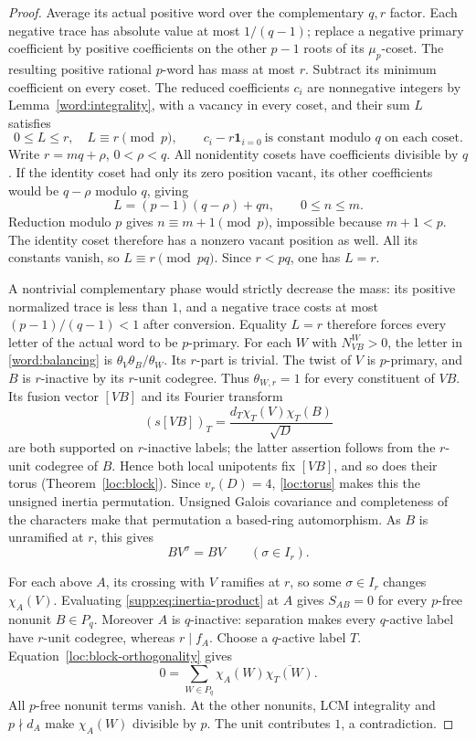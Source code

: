 \documentclass[11pt,a4paper]{article}
\numberwithin{equation}{section}
\begin{document}
\begin{proof}
Average its actual positive word over the complementary
$q,r$ factor. Each negative trace has absolute value at
most $1/(q-1)$; replace a negative primary coefficient
by positive coefficients on the other $p-1$ roots of
its $\mu_p$-coset. The resulting positive rational
$p$-word has mass at most $r$. Subtract its minimum
coefficient on every coset. The reduced coefficients
$c_i$ are nonnegative integers by Lemma~\ref{word:integrality},
with a vacancy in every coset, and their sum $L$ satisfies
\[
 0\le L\le r,\quad L\equiv r\pmod p,\qquad
 c_i-r\mathbf1_{i=0}\ \text{is constant modulo $q$ on each coset}.
\]
Write $r=mq+\rho$, $0<\rho<q$. All nonidentity cosets
have coefficients divisible by $q$. If the identity
coset had only its zero position vacant, its other
coefficients would be $q-\rho$ modulo $q$, giving
\[
 L=(p-1)(q-\rho)+qn,\qquad 0\le n\le m.
\]
Reduction modulo $p$ gives $n\equiv m+1\pmod p$,
impossible because $m+1<p$. The identity coset therefore
has a nonzero vacant position as well. All its constants
vanish, so $L\equiv r\pmod{pq}$. Since $r<pq$, one has
$L=r$.

A nontrivial complementary phase would strictly decrease the mass:
its positive normalized trace is less than $1$, and a negative trace
costs at most $(p-1)/(q-1)<1$ after conversion. Equality $L=r$
therefore forces every letter of the actual word to be $p$-primary.
For each $W$ with $N_{VB}^W>0$, the letter in
\eqref{word:balancing} is $\theta_V\theta_B/\theta_W$.
Its $r$-part is trivial. The twist of $V$ is $p$-primary,
and $B$ is $r$-inactive by its $r$-unit codegree. Thus
$\theta_{W,r}=1$ for every constituent of $VB$. Its fusion
vector $[VB]$ and its Fourier transform
\[
              (s[VB])_T
              =\frac{d_T\chi_T(V)\chi_T(B)}{\sqrt D}
\]
are both supported on $r$-inactive labels; the latter
assertion follows from the $r$-unit codegree of $B$.
Hence both local unipotents fix $[VB]$, and so does
their torus (Theorem~\ref{loc:block}). Since $v_r(D)=4$,
\eqref{loc:torus} makes this the unsigned inertia permutation.
Unsigned Galois covariance and completeness of the characters
make that permutation a based-ring automorphism. As $B$ is
unramified at $r$, this gives
\begin{equation}\label{supp:eq:inertia-product}
                    BV^\sigma=BV\qquad(\sigma\in I_r).
\end{equation}

For each above $A$, its crossing with $V$ ramifies at
$r$, so some $\sigma\in I_r$ changes $\chi_A(V)$.
Evaluating \eqref{supp:eq:inertia-product} at $A$ gives
$S_{AB}=0$ for every $p$-free nonunit $B\in P_q$.
Moreover $A$ is $q$-inactive: separation makes every
$q$-active label have $r$-unit codegree, whereas $r\mid f_A$.
Choose a $q$-active label $T$. Equation~\eqref{loc:block-orthogonality}
gives
\[
                 0=\sum_{W\in P_q}
                       \chi_A(W)\overline{\chi_T(W)}.
\]
All $p$-free nonunit terms vanish. At the other nonunits,
LCM integrality and $p\nmid d_A$ make $\chi_A(W)$
divisible by $p$. The unit contributes $1$, a contradiction.
\end{proof}
\end{document}
